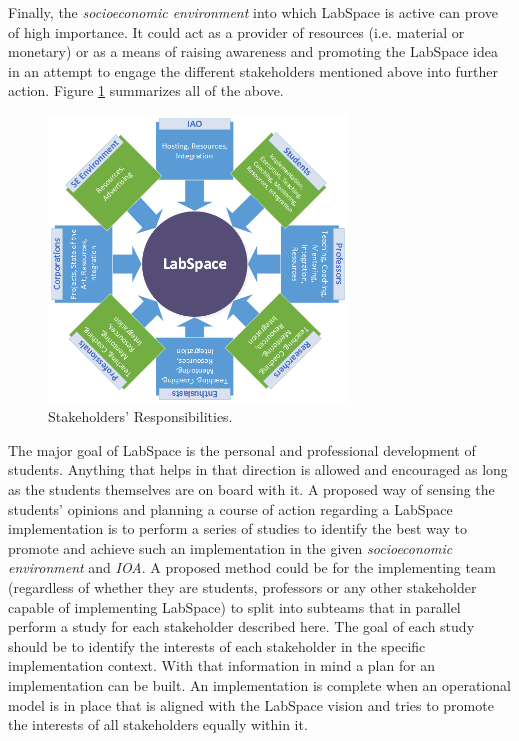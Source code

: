 \documentclass[a4paper, 11pt]{article}
\begin{document}
Finally, the \textit{socioeconomic environment} into which LabSpace is active can prove of high importance. It could act as a provider of resources (i.e. material or monetary) or as a means of raising awareness and promoting the LabSpace idea in an attempt to engage the different stakeholders mentioned above into further action. Figure \ref{fig:ls_responsibilities} summarizes all of the above.

\begin{figure}[h!]
  \begin{center}
    \includegraphics[width=300px,height=\textheight,keepaspectratio]{imagery/ls_stakeholders.png}
    \caption{Stakeholders' Responsibilities.}
    \label{fig:ls_responsibilities}
  \end{center}
\end{figure}

The major goal of LabSpace is the personal and professional development of students. Anything that helps in that direction is allowed and encouraged as long as the students themselves are on board with it. A proposed way of sensing the students' opinions and planning a course of action regarding a LabSpace implementation is to perform a series of studies to identify the best way to promote and achieve such an implementation in the given \textit{socioeconomic environment} and \textit{IOA}. A proposed method could be for the implementing team (regardless of whether they are students, professors or any other stakeholder capable of implementing LabSpace) to split into subteams that in parallel perform a study for each stakeholder described here. The goal of each study should be to identify the interests of each stakeholder in the specific implementation context. With that information in mind a plan for an implementation can be built. An implementation is complete when an operational model is in place that is aligned with the LabSpace vision and tries to promote the interests of all stakeholders equally within it.
\end{document}
